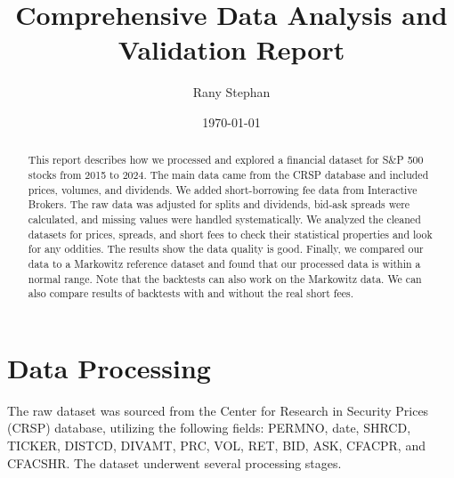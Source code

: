 \documentclass[11pt, letterpaper]{article}
\title{Comprehensive Data Analysis and Validation Report}
\author{Rany Stephan}
\date{\today}
\begin{document}
\maketitle

\begin{abstract}
This report describes how we processed and explored a financial dataset for S\&P 500 stocks from 2015 to 2024. The main data came from the CRSP database and included prices, volumes, and dividends. We added short-borrowing fee data from Interactive Brokers. The raw data was adjusted for splits and dividends, bid-ask spreads were calculated, and missing values were handled systematically. We analyzed the cleaned datasets for prices, spreads, and short fees to check their statistical properties and look for any oddities. The results show the data quality is good. Finally, we compared our data to a Markowitz reference dataset and found that our processed data is within a normal range. Note that the backtests can also work on the Markowitz data. We can also compare results of backtests with and without the real short fees. 
\end{abstract}

\clearpage

\section{Data Processing}
The raw dataset was sourced from the Center for Research in Security Prices (CRSP) database, utilizing the following fields: PERMNO, date, SHRCD, TICKER, DISTCD, DIVAMT, PRC, VOL, RET, BID, ASK, CFACPR, and CFACSHR. The dataset underwent several processing stages.
\end{document}
